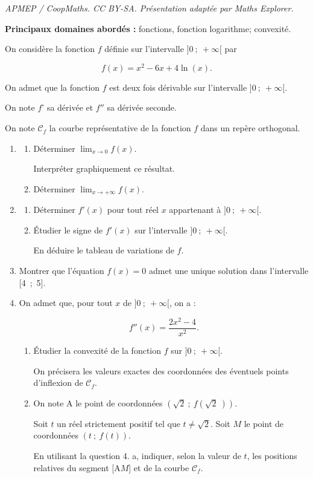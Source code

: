 \documentclass[10pt]{article}
\begin{document}
\noindent\textit{APMEP / CoopMaths. CC BY-SA. Présentation adaptée par Maths Explorer.}\par\medskip
\medskip

\textbf{Principaux domaines abordés :} fonctions, fonction logarithme; convexité.

\medskip

On considère la fonction $f$ définie sur l'intervalle $]0~;~+\infty[$ par

\[f(x) = x^2 - 6x + 4\ln (x).\]

On admet que la fonction $f$ est deux fois dérivable sur l'intervalle $]0~;~+ \infty[$.

On note $f$' sa dérivée et $f''$ sa dérivée seconde.

On note $\mathcal{C}_f$ la courbe représentative de la fonction $f$ dans un repère orthogonal.

\medskip

\begin{enumerate}
\item 
	\begin{enumerate}
		\item Déterminer $\displaystyle\lim_{x \to 0} f(x)$.
	
Interpréter graphiquement ce résultat.
		\item Déterminer $\displaystyle\lim_{x \to + \infty} f(x)$.
	\end{enumerate}	
\item
	\begin{enumerate}
		\item Déterminer $f'(x)$ pour tout réel $x$ appartenant à $]0~;~+ \infty[$.

		\item Étudier le signe de $f'(x)$ sur l'intervalle $]0~;~+ \infty[$.
		
En déduire le tableau de variations de $f$.
	\end{enumerate}
\item Montrer que l'équation $f(x) = 0$ admet une unique solution dans l'intervalle [4~;~5].
\item On admet que, pour tout $x$ de $]0~;~+ \infty[$, on a :

\[f''(x) = \dfrac{2x^2 - 4}{x^2}.\]

	\begin{enumerate}
		\item Étudier la convexité de la fonction $f$ sur $]0~;~+ \infty[$.
		
On précisera les valeurs exactes des coordonnées des éventuels points d'inflexion de $\mathcal{C}_f$.
		\item On note A le point de coordonnées $\left(\sqrt 2~;~f\left(\sqrt 2~\right)\right)$.
		
Soit $t$ un réel strictement positif tel que $t \ne \sqrt 2$. Soit $M$ le point de coordonnées $(t~;~ f(t))$.

En utilisant la question 4. a, indiquer, selon la valeur de $t$, les positions relatives du segment [A$M$] et de la courbe $\mathcal{C}_f$.
	\end{enumerate}
\end{enumerate}

\bigskip
\end{document}
